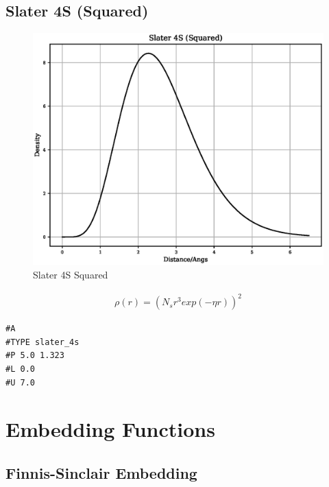 \clearpage
\FloatBarrier
\subsection{Slater 4S (Squared)}

\begin{figure}[h]
  \begin{center}
    \includegraphics[width=120mm]{appendix/functions/plots/slater_4s.eps}
    \caption{Slater 4S Squared}
    \label{graph:Slater4SSquared}
  \end{center}
\end{figure}

\begin{equation}
\begin{split}
\rho(r) = (N_s r^3 exp(-\eta r))^2 
\end{split}
\label{eq:slater4S}
\end{equation}

\begin{lstlisting}[style=sPseudo,caption={Slater 4S}]
#A
#TYPE slater_4s
#P 5.0 1.323
#L 0.0
#U 7.0
\end{lstlisting}







\clearpage
\FloatBarrier
\section{Embedding Functions}

\FloatBarrier
\subsection{Finnis-Sinclair Embedding}


